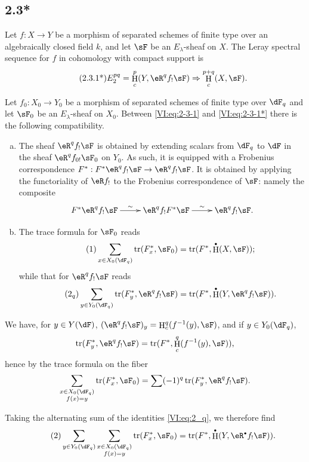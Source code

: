 \documentclass[oneside]{book}
\DeclareMathOperator{\h}{H}
\DeclareMathOperator{\tr}{tr}
\theoremstyle{sga-source}
\theoremstyle{sga-source-dash}
\theoremstyle{sga-source-dotdash}
\theoremstyle{sga-source-number-note-dash}
\theoremstyle{sga-source-note-number-dotdash}
\theoremstyle{sga-source-example-dotdash}
\theoremstyle{sga-source-inline-number}
\theoremstyle{sga-source-bare-number}
\theoremstyle{sga-source}
\let\oldbullet\bullet
\renewcommand{\bullet}{\textnormal{\tiny$\oldbullet$}}
\newcommand{\PrintPage}[1]{}\newcommand{\MathPage}[1]{}\newcommand{\PrintCite}[2]{#1}\newcommand{\var}[3]{#1}
\begin{document}
\PrintPage{184}
\subsection*{2.3*}\label{VI:2-3*}

Let $f:X\to Y$ be a morphism of separated schemes of finite type over an 
algebraically closed field $k$, and let $\sF$ be an $E_\lambda$-sheaf on $X$. The 
Leray spectral sequence for $f$ in cohomology with compact support is 
\begin{align*}\tag{2.3.1*}\label{VI:eq:2-3-1*}
  E_2^{p q} = \h_c^p(Y,\eR^q f_! \sF) \Rightarrow \h_c^{p+q}(X,\sF) \text{.}
\end{align*}

Let $f_0:X_0 \to Y_0$ be a morphism of separated schemes of finite type over 
$\dF_q$ and let $\sF_0$ be an $E_\lambda$-sheaf on $X_0$. Between 
\eqref{VI:eq:2-3-1} and \eqref{VI:eq:2-3-1*} there is the following compatibility. 

\begin{enumerate}[a)]
  \item The sheaf $\eR^q f_! \sF$ is obtained by extending scalars from 
    $\dF_q$ to $\dF$ in the sheaf $\eR^q f_{0!} \sF_0$ on $Y_0$. As 
    such, it is equipped with a Frobenius correspondence 
    $F^\ast:F^\ast\eR^q f_! \sF \to \eR^q f_! \sF$. It is obtained by applying 
    the functoriality of $\eR f_!$ to the Frobenius correspondence of $\sF$: 
    namely the composite 
    \[\xymatrix{
      F^\ast \eR^q f_! \sF \ar[r]^-\sim 
        & \eR^q f_! F^\ast \sF \ar[r]^-\sim 
        & \eR^q f_! \sF \text{.}
    }\]
  \item The trace formula for $\sF_0$ reads 
    \begin{align*}\tag{1}\label{VI:eq:1}
      \sum_{x\in X_0(\dF_q)} \tr(F_x^\ast,\sF_0) = \var{\tr(F^\ast,\h^\bullet(X,\sF))}{\tr(F^\ast,\h_c^\bullet(X,\sF))}{S45-SOL-0736} \text{;}
    \end{align*}
    while that for $\eR^q f_! \sF$ reads 
    \begin{align*}\tag{2$_q$}\label{VI:eq:2_q} 
      \sum_{y\in Y_0(\dF_q)} \tr(F_y^\ast,\eR^q f_! \sF) = \var{\tr(F^\ast, \h^\bullet(Y,\eR^q f_! \sF))}{\tr(F^\ast,\h_c^\bullet(Y,\eR^q f_! \sF))}{S45-SOL-0737} \text{.}
    \end{align*}
\end{enumerate}

We have, for $y\in Y(\dF)$, $(\eR^q f_! \sF)_y = \h_c^q(f^{-1}(y),\sF)$, and if 
$y\in Y_0(\dF_q)$, 
\[
  \tr(F_y^\ast,\eR^q f_! \sF) = \tr(F^\ast,\h_c^q(f^{-1}(y),\sF)) \text{,}
\]
hence by the trace formula on the fiber 
\[
  \sum_{\substack{x\in X_0(\dF_q) \\ f(x) = y}} \tr(F_x^\ast,\sF_0) = \sum (-1)^q \tr(F_y^\ast,\eR^q f_! \sF) \text{.}
\]
\PrintPage{185}
Taking the alternating sum of the identities \eqref{VI:eq:2_q}, we therefore find 
\begin{align*}\tag{2}\label{VI:eq:2}
  \sum_{y\in Y_0(\dF_q)} \sum_{\substack{x \in X_0(\dF_q) \\ f(x) = y}} \tr(F_x^\ast,\sF_0) = \var{\tr(F^\ast,\h^\bullet(Y,\eR^\bullet f_! \sF))}{\tr(F^\ast,\h_c^\bullet(Y,\eR^\bullet f_! \sF))}{S45-SOL-0738} \text{.}
\end{align*}
\end{document}
